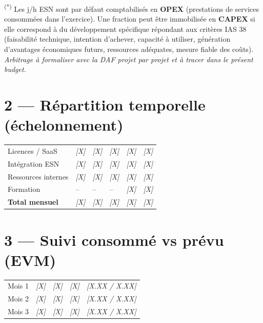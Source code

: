 \documentclass[11pt,a4paper,oneside]{report}
\begin{document}
\vspace{4pt}
{\footnotesize
\textsuperscript{(*)} Les j/h ESN sont par défaut comptabilisés en \textbf{OPEX} (prestations de services consommées dans l'exercice). Une fraction peut être immobilisée en \textbf{CAPEX} si elle correspond à du développement spécifique répondant aux critères IAS 38 (faisabilité technique, intention d'achever, capacité à utiliser, génération d'avantages économiques futurs, ressources adéquates, mesure fiable des coûts). \textit{Arbitrage à formaliser avec la DAF projet par projet et à tracer dans le présent budget.}
}

\section*{2 — Répartition temporelle (échelonnement)}

\renewcommand{\arraystretch}{1.3}
\begin{tabularx}{\textwidth}{L{5cm} C{2cm} C{2cm} C{2cm} C{2cm} C{2cm}}
\toprule
{} &  &  &  &  &  \\
\midrule
Licences / SaaS      & \textit{[X]} & \textit{[X]} & \textit{[X]} & \textit{[X]} & \textit{[X]} \\
Intégration ESN      & \textit{[X]} & \textit{[X]} & \textit{[X]} & \textit{[X]} & \textit{[X]} \\
Ressources internes  & \textit{[X]} & \textit{[X]} & \textit{[X]} & \textit{[X]} & \textit{[X]} \\
Formation            & --           & --           & --           & \textit{[X]} & \textit{[X]} \\
\midrule
{}\textbf{Total mensuel} & \textit{[X]} & \textit{[X]} & \textit{[X]} & \textit{[X]} & \textit{[X]} \\
\bottomrule
\end{tabularx}

\section*{3 — Suivi consommé vs prévu (EVM)}

\renewcommand{\arraystretch}{1.3}
\begin{tabularx}{\textwidth}{L{4cm} C{2.5cm} C{2.5cm} C{2.5cm} Y}
\toprule
{} &  &  &  &  \\
\midrule
Mois 1 & \textit{[X]} & \textit{[X]} & \textit{[X]} & \textit{[X.XX / X.XX]} \\
Mois 2 & \textit{[X]} & \textit{[X]} & \textit{[X]} & \textit{[X.XX / X.XX]} \\
Mois 3 & \textit{[X]} & \textit{[X]} & \textit{[X]} & \textit{[X.XX / X.XX]} \\
\bottomrule
\end{tabularx}
\end{document}
